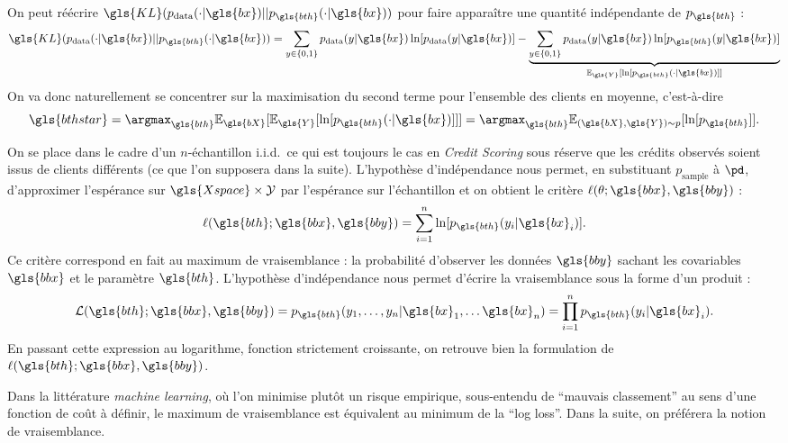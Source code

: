 On peut réécrire $\gls{KL}(p_{\text{data}}(\cdot|\gls{bx})||p_{\gls{bth}}(\cdot|\gls{bx}))$ pour faire apparaître une quantité indépendante de $p_{\gls{bth}}$ :
\[ \gls{KL}(p_{\text{data}}(\cdot|\gls{bx})||p_{\gls{bth}}(\cdot|\gls{bx})) = \sum_{y \in \{0,1\}} p_{\text{data}}(y|\gls{bx}) \ln [p_{\text{data}}(y|\gls{bx})] - \underbrace{\sum_{y \in \{0,1\}} p_{\text{data}}(y|\gls{bx}) \ln [p_{\gls{bth}}(y|\gls{bx})]}_{\mathbb{E}_{\gls{Y}} [\ln[p_{\gls{bth}}(\cdot|\gls{bx})]]}  \]
On va donc naturellement se concentrer sur la maximisation du second terme pour l'ensemble des clients en moyenne, c'est-à-dire 
\[\gls{bthstar} = \argmax_{\gls{bth}} \mathbb{E}_{\gls{bX}}  [\mathbb{E}_{\gls{Y}} [\ln[p_{\gls{bth}}(\cdot|\gls{bx})]]] = \argmax_{\gls{bth}} \mathbb{E}_{(\gls{bX},\gls{Y}) \sim p} [\ln[p_{\gls{bth}}]].\]

On se place dans le cadre d'un $n$-échantillon i.i.d.\ ce qui est toujours le cas en \textit{Credit Scoring} sous réserve que les crédits observés soient issus de clients différents (ce que l'on supposera dans la suite). L'hypothèse d'indépendance nous permet, en substituant ${p_{\text{sample}}}$ à $\pd$, d'approximer l'espérance sur $\gls{Xspace} \times \mathcal{Y}$ par l'espérance sur l'échantillon et on obtient le critère $\ell(\theta;\gls{bbx},\gls{bby})$ :
\begin{equation} \label{eq:vraisemblance}
\ell(\gls{bth};\gls{bbx},\gls{bby}) = \sum_{i=1}^n \ln[p_{\gls{bth}}(y_i | \gls{bx}_i) ].
\end{equation}
Ce critère correspond en fait au maximum de vraisemblance : la probabilité d'observer les données $\gls{bby}$ sachant les covariables $\gls{bbx}$ et le paramètre $\gls{bth}$. L'hypothèse d'indépendance nous permet d'écrire la vraisemblance sous la forme d'un produit : $$\mathcal{L}(\gls{bth};\gls{bbx},\gls{bby}) = p_{\gls{bth}}(y_1,\dots,y_n | \gls{bx}_1,\dots \gls{bx}_n) = \prod_{i=1}^n p_{\gls{bth}}(y_i | \gls{bx}_i).$$ En passant cette expression au logarithme, fonction strictement croissante, on retrouve bien la formulation de $\ell(\gls{bth};\gls{bbx},\gls{bby})$.

Dans la littérature \textit{machine learning}, où l'on minimise plutôt un risque empirique, sous-entendu de ``mauvais classement'' au sens d'une fonction de coût à définir, le maximum de vraisemblance est équivalent au minimum de la ``log loss''. Dans la suite, on préférera la notion de vraisemblance.

